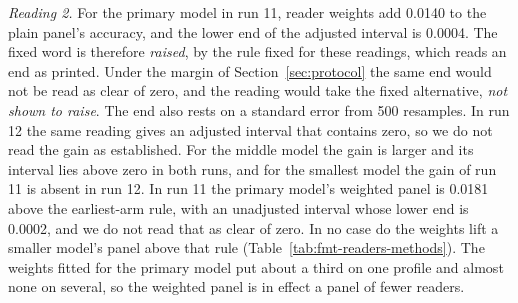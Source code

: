 \emph{Reading 2.} For the primary model in run 11, reader weights add 0.0140 to the plain panel's accuracy, and the lower end of the adjusted interval is 0.0004. The fixed word is therefore \emph{raised}, by the rule fixed for these readings, which reads an end as printed. Under the margin of Section~\ref{sec:protocol} the same end would not be read as clear of zero, and the reading would take the fixed alternative, \emph{not shown to raise}. The end also rests on a standard error from 500 resamples. In run 12 the same reading gives an adjusted interval that contains zero, so we do not read the gain as established. For the middle model the gain is larger and its interval lies above zero in both runs, and for the smallest model the gain of run 11 is absent in run 12. In run 11 the primary model's weighted panel is 0.0181 above the earliest-arm rule, with an unadjusted interval whose lower end is 0.0002, and we do not read that as clear of zero. In no case do the weights lift a smaller model's panel above that rule (Table~\ref{tab:fmt-readers-methods}). The weights fitted for the primary model put about a third on one profile and almost none on several, so the weighted panel is in effect a panel of fewer readers.

